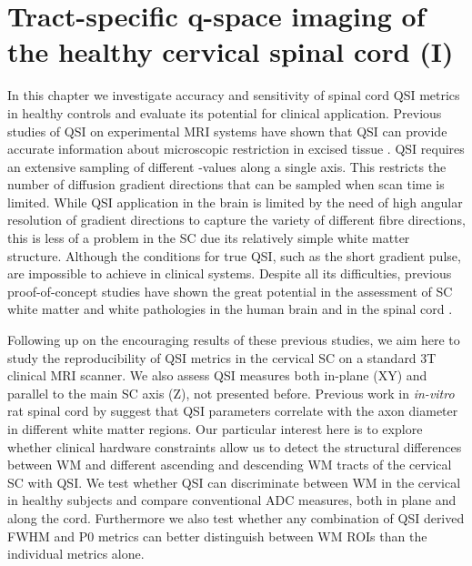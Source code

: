 \chapter{Tract-specific q-space imaging of the healthy cervical spinal cord (I)}
\label{chapter5}
\glsresetall %
In this chapter we investigate accuracy and sensitivity of spinal cord \gls{QSI} metrics in healthy controls and evaluate its potential for clinical application. Previous studies of \gls{QSI} on experimental MRI systems have shown that \gls{QSI} can provide accurate information about microscopic restriction in excised tissue \citep{Assaf:2000,Bar-Shir:2008,Ong:2008}. \Gls{QSI} requires an extensive sampling of different {\q}-values along a single axis. This restricts the number of diffusion gradient directions that can be sampled when scan time is limited. While \gls{QSI} application in the brain is limited by the need of high angular resolution of gradient directions to capture the variety of different fibre directions, this is less of a problem in the \gls{SC} due its relatively simple white matter structure. Although the conditions for true \gls{QSI}, such as the short gradient pulse, are impossible to achieve in clinical systems. Despite all its difficulties, previous proof-of-concept studies have shown the great potential in the assessment of {\gls{SC}} white matter and white pathologies in the human brain \citep{Assaf:2002,Yamada:2012} and in the spinal cord \citep{Farrell:2008}.

Following up on the encouraging results of these previous studies, we aim here to study the reproducibility of \gls{QSI} metrics in the cervical {\gls{SC}} on a standard 3T clinical MRI scanner. We also assess \gls{QSI} measures both in-plane (XY) and parallel to the main {\gls{SC}} axis (Z), not presented before. Previous work in \emph{in-vitro} rat spinal cord by \citet{Ong:2008,Ong:2010} suggest that \gls{QSI} parameters correlate with the axon diameter in different white matter regions. Our particular interest here is to explore whether clinical hardware constraints allow us to detect the structural differences between \gls{WM} and different ascending and descending \gls{WM} tracts of the cervical {\gls{SC}} with \gls{QSI}. We test whether \gls{QSI} can discriminate between \gls{WM} in the cervical in healthy subjects and compare conventional \gls{ADC} measures, both in plane and along the cord. Furthermore we also test whether any combination of \gls{QSI} derived FWHM and P0 metrics can better distinguish between WM \glspl{ROI} than the individual metrics alone.


